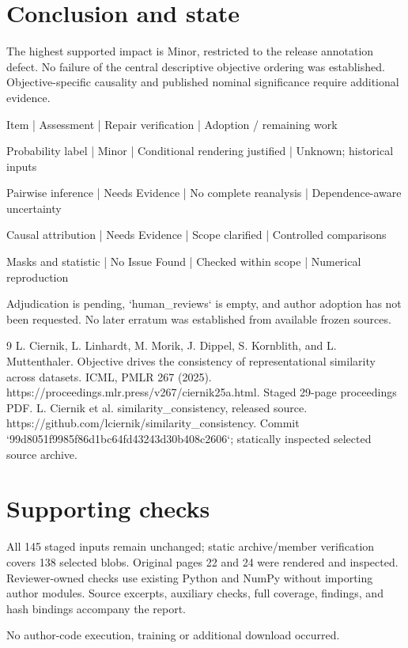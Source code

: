 \documentclass[10pt]{article}
\begin{document}
\section*{Conclusion and state}
The highest supported impact is Minor, restricted to the release annotation defect. No failure of the central descriptive objective ordering was established. Objective-specific causality and published nominal significance require additional evidence.\par
Item | Assessment | Repair verification | Adoption / remaining work\par
Probability label | Minor | Conditional rendering justified | Unknown; historical inputs\par
Pairwise inference | Needs Evidence | No complete reanalysis | Dependence-aware uncertainty\par
Causal attribution | Needs Evidence | Scope clarified | Controlled comparisons\par
Masks and statistic | No Issue Found | Checked within scope | Numerical reproduction\par
Adjudication is pending, `human\_reviews` is empty, and author adoption has not been requested. No later erratum was established from available frozen sources.\par
9 L. Ciernik, L. Linhardt, M. Morik, J. Dippel, S. Kornblith, and L. Muttenthaler. Objective drives the consistency of representational similarity across datasets. ICML, PMLR 267 (2025). https://proceedings.mlr.press/v267/ciernik25a.html. Staged 29-page proceedings PDF. L. Ciernik et al. similarity\_consistency, released source. https://github.com/lciernik/similarity\_consistency. Commit `99d8051f9985f86d1bc64fd43243d30b408c2606`; statically inspected selected source archive.\par
\section*{Supporting checks}
All 145 staged inputs remain unchanged; static archive/member verification covers 138 selected blobs. Original pages 22 and 24 were rendered and inspected. Reviewer-owned checks use existing Python and NumPy without importing author modules. Source excerpts, auxiliary checks, full coverage, findings, and hash bindings accompany the report.\par
No author-code execution, training or additional download occurred.\par
\end{document}

